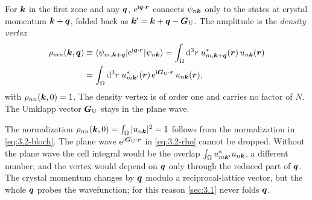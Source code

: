 \begin{keyresult}
For $\bm{k}$ in the first zone and any $\bm{q}$, $\mathrm{e}^{\mathrm{i}\bm{q}\cdot\bm{r}}$ connects $\psi_{n\bm{k}}$ only to the states at crystal momentum $\bm{k} + \bm{q}$, folded back as $\bm{k}' = \bm{k} + \bm{q} - \bm{G}_{\mathrm{U}}$. The amplitude is the \emph{density vertex}
\begin{equation}
  \begin{aligned}
  \rho_{mn}(\bm{k},\bm{q}) &\equiv \langle\psi_{m,\bm{k}+\bm{q}}|\mathrm{e}^{\mathrm{i}\bm{q}\cdot\bm{r}}|\psi_{n\bm{k}}\rangle
  = \int_\Omega\mathrm{d}^3r\;u^*_{m,\bm{k}+\bm{q}}(\bm{r})\,u_{n\bm{k}}(\bm{r}) \\
  &= \int_\Omega\mathrm{d}^3r\;u^*_{m\bm{k}'}(\bm{r})\,\mathrm{e}^{\mathrm{i}\bm{G}_{\mathrm{U}}\cdot\bm{r}}\,u_{n\bm{k}}(\bm{r}),
  \end{aligned}
  \label{eq:3.2-rho}
\end{equation}
with $\rho_{nn}(\bm{k},0) = 1$. The density vertex is of order one and carries no factor of $N$. The Umklapp vector $\bm{G}_{\mathrm{U}}$ stays in the plane wave.
\end{keyresult}
The normalization $\rho_{nn}(\bm{k},0) = \int_\Omega|u_{n\bm{k}}|^2 = 1$ follows from the normalization in \cref{eq:3.2-bloch}. The plane wave $\mathrm{e}^{\mathrm{i}\bm{G}_{\mathrm{U}}\cdot\bm{r}}$ in \cref{eq:3.2-rho} cannot be dropped. Without the plane wave the cell integral would be the overlap $\int_\Omega u^*_{m\bm{k}'}u_{n\bm{k}}$, a different number, and the vertex would depend on $\bm{q}$ only through the reduced part of $\bm{q}$. The crystal momentum changes by $\bm{q}$ modulo a reciprocal-lattice vector, but the whole $\bm{q}$ probes the wavefunction; for this reason \cref{sec:3.1} never folds $\bm{q}$.

